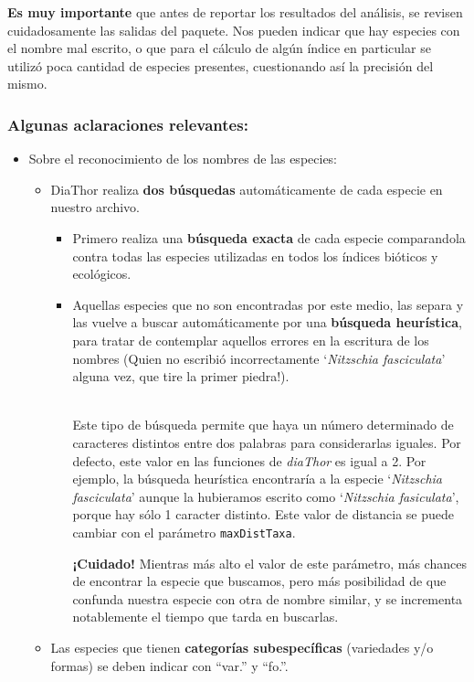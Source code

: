 \documentclass[
]{book}
\begin{document}
\textbf{Es muy importante} que antes de reportar los resultados del análisis, se revisen cuidadosamente las salidas del paquete. Nos pueden indicar que hay especies con el nombre mal escrito, o que para el cálculo de algún índice en particular se utilizó poca cantidad de especies presentes, cuestionando así la precisión del mismo.

\hypertarget{algunas-aclaraciones-relevantes}{%
\subsubsection{\texorpdfstring{\textbf{Algunas aclaraciones relevantes:}}{Algunas aclaraciones relevantes:}}\label{algunas-aclaraciones-relevantes}}

\begin{itemize}
\item
  Sobre el reconocimiento de los nombres de las especies:

  \begin{itemize}
  \item
    DiaThor realiza \textbf{dos búsquedas} automáticamente de cada especie en nuestro archivo.

    \begin{itemize}
    \item
      Primero realiza una \textbf{búsqueda exacta} de cada especie comparandola contra todas las especies utilizadas en todos los índices bióticos y ecológicos.
    \item
      Aquellas especies que no son encontradas por este medio, las separa y las vuelve a buscar automáticamente por una \textbf{búsqueda heurística}, para tratar de contemplar aquellos errores en la escritura de los nombres (Quien no escribió incorrectamente `\emph{Nitzschia fasciculata}' alguna vez, que tire la primer piedra!).\\
      \strut \\
      Este tipo de búsqueda permite que haya un número determinado de caracteres distintos entre dos palabras para considerarlas iguales. Por defecto, este valor en las funciones de \emph{diaThor} es igual a 2. Por ejemplo, la búsqueda heurística encontraría a la especie `\emph{Nitzschia fasciculata}' aunque la hubieramos escrito como `\emph{Nitzschia fasiculata}', porque hay sólo 1 caracter distinto. Este valor de distancia se puede cambiar con el parámetro \texttt{maxDistTaxa}.

      \textbf{¡Cuidado!} Mientras más alto el valor de este parámetro, más chances de encontrar la especie que buscamos, pero más posibilidad de que confunda nuestra especie con otra de nombre similar, y se incrementa notablemente el tiempo que tarda en buscarlas.
    \end{itemize}
  \item
    Las especies que tienen \textbf{categorías subespecíficas} (variedades y/o formas) se deben indicar con ``var.'' y ``fo.''.


\end{itemize}
\end{itemize}
\end{document}
